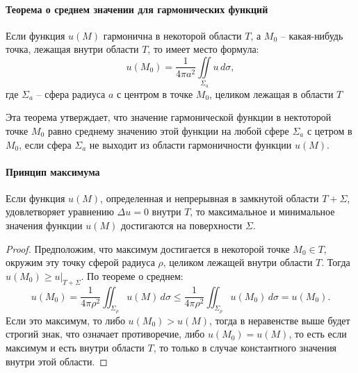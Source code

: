 \paragraph{Теорема о среднем значении для гармонических функций}
\begin{theorem}
  Если функция $u(M)$ гармонична в некоторой области $T$, а $M_0$ -- какая-нибудь точка, лежащая
  внутри области $T$, то имеет место формула:
  \[
    u(M_0) = \dfrac{1}{4\pi a^2} \iint \limits_{\Sigma_a} u \, d\sigma,
  \]
  где $\Sigma_a$ -- сфера радиуса $a$ с центром в точке $M_0$, целиком лежащая в области $T$
\end{theorem}

Эта теорема утверждает, что значение гармонической функции в нектоторой точке $M_0$ равно
среднему значению этой функции на любой сфере $\Sigma_a$ с цетром в $M_0$, если сфера
$\Sigma_a$ не выходит из области гармоничности функции $u(M)$.

\paragraph{Принцип максимума}

\begin{theorem}
  Если функция $u(M)$, определенная и непрерывная в замкнутой области $T+\Sigma$, удовлетворяет
  уравнению $\Delta u = 0$ внутри $T$, то максимальное и минимальное значения функции $u(M)$
  достигаются на поверхности $\Sigma$.
\end{theorem}

\begin{proof}
	Предположим, что максимум достигается в некоторой точке $M_0 \in T$,
	окружим эту точку сферой радиуса $\rho$, целиком лежащей внутри области $T$. Тогда
	$u(M_0) \geqslant \left. u \right|_{T+\Sigma}$. По теореме о среднем: 
	\[
	u(M_0) = \dfrac{1}{4\pi \rho^2} \iint_{\Sigma_\rho} u(M) \, d\sigma \leqslant 
	\dfrac{1}{4\pi \rho^2} \iint_{\Sigma_\rho} u(M_0) \, d\sigma = u(M_0).
	\]
	Если это максимум, то либо $u(M_0) > u(M)$, тогда в неравенстве выше будет строгий знак, что
	означает противоречие, либо $u(M_0) = u(M)$, то есть если максимум и есть внутри области $T$, 
	то только в случае константного значения внутри этой области.
\end{proof}

